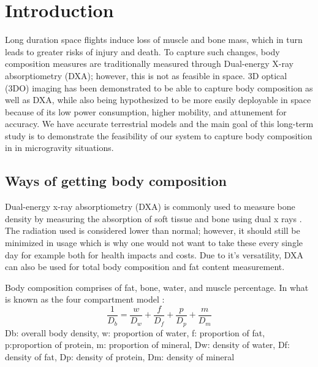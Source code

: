 

\chapter{Introduction}

Long duration space flights induce loss of muscle and bone mass, which in turn leads to greater risks of injury and death. To capture such changes, body composition measures are traditionally measured through Dual-energy X-ray absorptiometry (DXA); however, this is not as feasible in space. 3D optical (3DO) imaging has been demonstrated to be able to capture body composition as well as DXA, while also being hypothesized to be more easily deployable in space because of its low power consumption, higher mobility, and attunement for accuracy. We have accurate terrestrial models and the main goal of this long-term study is to demonstrate the feasibility of our system to capture body composition in in microgravity situations. 
\section{Ways of getting body composition}
Dual-energy x-ray absorptiometry (DXA) is commonly used to measure bone density by measuring the absorption of soft tissue and bone using dual x rays \cite{albanese2003clinical}. The radiation used is considered lower than normal; however, it should still be minimized in usage which is why one would not want to take these every single day for example both for health impacts and costs. Due to it's versatility, DXA can also be used for total body composition and fat content measurement.

Body composition comprises of fat, bone, water, and muscle percentage. In what is known as the four compartment model \cite{fuller1992four}:
\begin{equation}
	\frac{1}{D_b} = \frac{w}{D_w} + \frac{f}{D_f} + \frac{p}{D_p} + \frac{m}{D_m}
\end{equation}
Db: overall body density, w: proportion of water, f: proportion of fat, p:proportion of protein, m: proportion of mineral, Dw: density of water, Df: density of fat, Dp: density of protein, Dm: density of mineral

